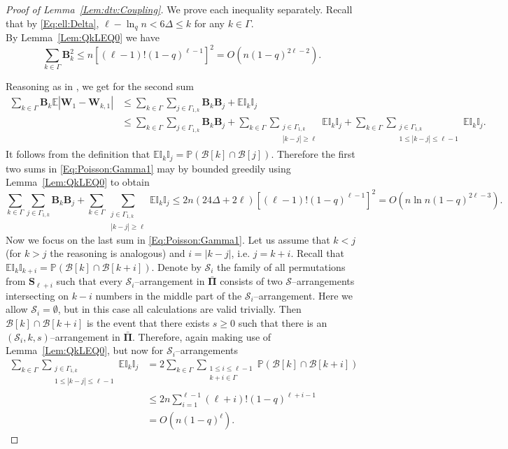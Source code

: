 \documentclass[letterpaper,11pt]{article}
\theoremstyle{definition}
\theoremstyle{remark}
\renewcommand{\le}{\leqslant}
\renewcommand{\ge}{\geqslant}
\newcommand{\bE}{\mathbb{E}}
\newcommand{\bS}{\mathbf{S}}
\newcommand{\Pra}[1]{\mathbb{P}\left(#1\right)}
\newcommand{\bB}{\mathbf{B}}
\newcommand{\cB}{\mathcal{B}}
\newcommand{\Ind}{\mathbb{I}}
\newcommand{\barPi}{\bar {\mathbf \Pi}}
\newcommand{\cS}{\mathcal{S}}
\newcommand{\bW}{\mathbf{W}}
\begin{document}
\begin{proof}[Proof of Lemma~\ref{Lem:dtv:Coupling}] We prove each inequality separately. Recall that by \eqref{Eq:ell:Delta},  $\ell - \ln_q n < 6\Delta\le k$ for any $k\in \Gamma$.  %
	\\
	By Lemma~\ref{Lem:QkLEQ0} we have
	\begin{equation*}
		\sum_{k\in \Gamma}\bB_k^2\le n [(\ell-1)!(1-q)^{\ell-1}]^2 = O(n(1-q)^{2\ell-2}).
	\end{equation*} 
	
	
	Reasoning as in \cite{Janson1994,BarbourHolstJansonBook},  we get for the second sum
	\begin{align}\nonumber
		\sum_{k\in \Gamma}\bB_k\bE|\bW_1-\bW_{k,1}|
		&\le \sum_{k\in \Gamma}\sum_{j\in \Gamma_{1,k}}\bB_k\bB_j+\bE\Ind_k\Ind_j\\
		&\le \sum_{k\in \Gamma}\sum_{j\in \Gamma_{1,k}}\bB_k\bB_j
		+\sum_{k\in \Gamma}\sum_{\substack{j\in \Gamma_{1,k}\\ |k-j|\ge \ell}}\bE\Ind_k\Ind_j
		+\sum_{k\in \Gamma}\sum_{\substack{j\in \Gamma_{1,k}\\ 1\le |k-j| \le  \ell-1}}\bE\Ind_k\Ind_j\label{Eq:Poisson:Gamma1}.
	\end{align}
	It follows from the definition that $\bE\Ind_k\Ind_j=\Pra{\cB[k]\cap \cB[j]}$. Therefore
	the first two sums in \eqref{Eq:Poisson:Gamma1} may by bounded  greedily using Lemma~\ref{Lem:QkLEQ0} to obtain
	\[
	\sum_{k\in \Gamma}\sum_{j\in \Gamma_{1,k}}\bB_k\bB_j
	+\sum_{k\in \Gamma}\sum_{\substack{j\in \Gamma_{1,k}\\ |k-j|\ge \ell}}\bE\Ind_k\Ind_j
	\le 2n(24\Delta+2\ell)[(\ell-1)!(1-q)^{\ell-1}]^2 = O\left(n\ln n(1-q)^{2\ell-3}\right).
	\]
	Now we focus on the last sum in \eqref{Eq:Poisson:Gamma1}. Let us assume that $k<j$ (for $k>j$ the reasoning is analogous) and  $i=|k-j|$, i.e. $j=k+i$. Recall that $\bE\Ind_k\Ind_{k+i}=\Pra{\cB[k]\cap \cB[k+i]}$. Denote by $\cS_i$ the family of all permutations from $\bS_{\ell+i}$ such that every $\cS_i$--arrangement in $\barPi$ consists of two $\cS$--arrangements intersecting on $k-i$ numbers in the middle part of the $\cS_i$--arrangement. Here we allow $\cS_i=\emptyset$, but in this case all calculations are valid trivially. Then $\cB[k]\cap \cB[k+i]$ is the event that there exists $s\ge 0$ such that there is an $(\cS_i,k,s)$--arrangement in $\barPi$. Therefore, again making use of Lemma~\ref{Lem:QkLEQ0}, but now for $\cS_i$--arrangements   
	\[
	\begin{split}
		\sum_{k\in \Gamma}\sum_{\substack{j\in \Gamma_{1,k}\\ 1\le |k-j| \le  \ell-1}}\bE\Ind_k\Ind_j
		&=2\sum_{k\in \Gamma}\sum_{\substack{1\le i\le \ell-1\\ k+i\in \Gamma}}\Pra{\cB[k]\cap \cB[k+i]}\\
		&\le 2 n \sum_{i=1}^{\ell-1}(\ell+i)!(1-q)^{\ell+i-1}\\
		&=O(n(1-q)^{\ell}).
	\end{split}
	\]
	

\end{proof}
\end{document}
